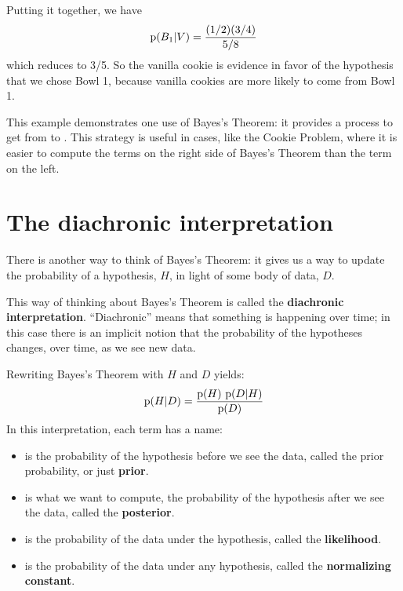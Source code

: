 \documentclass[12pt]{book}
\begin{document}
Putting it together, we have 
%
\[ \mathrm{p}(B_1|V) = \frac{(1/2)(3/4)}{5/8} \]
%
which reduces to 3/5.  So the vanilla cookie is evidence in favor of
the hypothesis that we chose Bowl 1, because vanilla cookies are more
likely to come from Bowl 1.

This example demonstrates one use of Bayes's Theorem: it provides
a process to get from  to .  This strategy is useful
in cases, like the Cookie Problem, where it is easier to compute
the terms on the right side of Bayes's Theorem than the term on the
left.


\section{The diachronic interpretation}

There is another way to think of Bayes's Theorem: it gives us a
way to update the probability of a hypothesis, $H$, in light of
some body of data, $D$.

This way of thinking about Bayes's Theorem is called the
{\bf diachronic interpretation}.  ``Diachronic'' means that something
is happening over time; in this case there is an implicit notion
that the probability of the hypotheses changes, over time, as
we see new data.

Rewriting Bayes's Theorem with $H$ and $D$ yields:
%
\[ \mathrm{p}(H|D) = \frac{\mathrm{p}(H)~\mathrm{p}(D|H)}{\mathrm{p}(D)} \]
%
In this interpretation, each term has a name:

\begin{itemize}

\item {} is the probability of the hypothesis before we see
the data, called the prior probability, or just {\bf prior}.

\item {} is what we want to compute, the probability of
the hypothesis after we see the data, called the {\bf posterior}.
 
\item {} is the probability of the data under the hypothesis,
called the {\bf likelihood}.

\item {} is the probability of the data under any hypothesis,
called the {\bf normalizing constant}.

\end{itemize}
\end{document}
